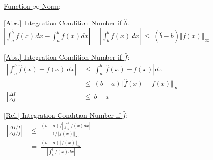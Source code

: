 \documentclass[12pt]{article}
\newcommand{\hs}{\hspace{1pt}}
\begin{document}
\vspace{5pt}
\begin{minipage}[t]{.36\textwidth}
    \underline{Function \(\infty\)-Norm}: \\[10pt] 
\end{minipage}
\begin{minipage}[t]{.63\textwidth}
    \underline{[Abs.] Integration Condition Number if \(\hat{b}\)}: \\[10pt]
    \(
        \left\vert \int_a^{\hat{b}} f(x)\hs dx - \int_a^b f(x)\hs dx \right\vert
        = \left\vert \int_b^{\hat{b}} f(x)\ dx \right\vert
        \ \leq\ \boxed{ (\hat{b}-b) \Vert f(x) \Vert_\infty }
    \)    
\end{minipage}

\vspace{5pt}
\begin{minipage}[t]{.56\textwidth}
    \underline{[Abs.] Integration Condition Number if \(\hat{f}\)}: \\[10pt]
    \(
        \begin{aligned}
            \left\vert \int_a^b \hat{f}(x) - f(x)\ dx \right\vert
                &\ \leq\ \int_a^b \left\vert \hat{f}(x) - f(x) \right\vert dx
                \\
            &\ \leq\ (b-a) \Vert \hat{f}(x) - f(x) \Vert_\infty
                \\
            \left\vert \frac{\Delta I}{\Delta f} \right\vert 
                &\ \leq\ \boxed{ b-a }
        \end{aligned}
    \)    
\end{minipage}
\begin{minipage}[t]{.43\textwidth}
    \underline{[Rel.] Integration Condition Number if \(\hat{f}\)}: \\[10pt]
    \(
        \begin{aligned}
            \left\vert \frac{\Delta I / I}{\Delta f / f} \right\vert 
                &\ \leq\ \frac{(b-a) / \left\vert \int_a^b f(x) dx \right\vert}{1 / \Vert f(x) \Vert_\infty}
                \\[5pt]
            &\ =\ \boxed{ \frac{(b-a) \Vert f(x) \Vert_\infty }{\left\vert \int_a^b f(x) dx \right\vert} }
        \end{aligned}
    \)
\end{minipage}
\end{document}
